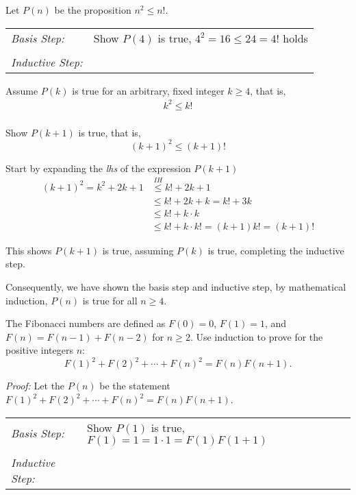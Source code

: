 \begin{questions}
\begin{solution}
\smallskip 
Let $P(n)$ be the proposition $n^2 \leq n!$.

\smallskip
\begin{tabular}{lp{4in}}
  \textit{Basis Step:} & Show $P(4)$ is true, $4^2 = 16 \leq 24 = 4!$ holds \\
   & \\
 \textit{Inductive Step:} &  \\
\end{tabular}

Assume $P(k)$ is true for an arbitrary, fixed integer $k \geq 4$, that is,
\begin{align*}
  k^2 \leq k! \tag{IH} \\
\end{align*}

Show $P(k+1)$ is true, that is,
\[  (k+1)^2 \leq (k+1)! \]

Start by expanding the \textit{lhs} of the expression $P(k+1)$
\begin{align*}
  (k+1)^2 = k^2 + 2k + 1 &\overset{IH}{\leq} k! + 2k +1 \\
   &\leq k! + 2k + k = k! + 3k  \tag{$k \geq 1$} \\
   &\leq k! + k\cdot k \tag{$k \geq 3$} \\
   &\leq k! + k\cdot k! = (k+1)k! = (k+1)! 
\end{align*}

This shows $P(k+1)$ is true, assuming $P(k)$ is true, completing the inductive step.

\smallskip
Consequently, we have shown the basis step and inductive step, by mathematical induction, $P(n)$ is true for all $n \geq 4$.
\end{solution}



  The Fibonacci numbers are defined as $F(0) = 0$, $F(1) = 1$, and $F(n) = F(n-1) + F(n-2)$ for $n \geq 2$.   Use induction to prove for the positive integers $n$: 
\[ F(1)^2 + F(2)^2 + \cdots + F(n)^2 = F(n)F(n+1). \]
    \ifprintanswers
        \vspace{-10pt}
   \fi
\begin{solution}
  \textit{Proof:}
  Let the $P(n)$ be the statement $F(1)^2 + F(2)^2 + \cdots + F(n)^2 = F(n)F(n+1)$.

  \smallskip
  \begin{tabular}{lp{4in}}
    \textit{Basis Step:} & Show $P(1)$ is true, $F(1) = 1 = 1\cdot1 = F(1)F(1+1)$ \\
     & \\
   \textit{Inductive Step:} &  \\
  \end{tabular}


\end{solution}
\end{questions}
